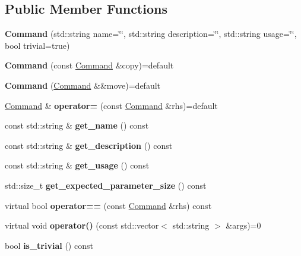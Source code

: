 \subsection*{Public Member Functions}
\begin{DoxyCompactItemize}
\item 
\mbox{\label{class_command_a3cf1e15c821380f4a12e8bd9da620da9}} 
{\bfseries Command} (std\+::string name=\char`\"{}\char`\"{}, std\+::string description=\char`\"{}\char`\"{}, std\+::string usage=\char`\"{}\char`\"{}, bool trivial=true)
\item 
\mbox{\label{class_command_a3d073078862b0cae3b4402f1e4c3b66e}} 
{\bfseries Command} (const \mbox{\hyperlink{class_command}{Command}} \&copy)=default
\item 
\mbox{\label{class_command_a4d99c9b56882eb7f9294ac9ba8e986f2}} 
{\bfseries Command} (\mbox{\hyperlink{class_command}{Command}} \&\&move)=default
\item 
\mbox{\label{class_command_ac482b3ec7da68a7173173e41410b3858}} 
\mbox{\hyperlink{class_command}{Command}} \& {\bfseries operator=} (const \mbox{\hyperlink{class_command}{Command}} \&rhs)=default
\item 
\mbox{\label{class_command_afc03c74d1f90127326015faa8f5f4866}} 
const std\+::string \& {\bfseries get\+\_\+name} () const
\item 
\mbox{\label{class_command_a6352942f26bc7f233584ee707ac46eb1}} 
const std\+::string \& {\bfseries get\+\_\+description} () const
\item 
\mbox{\label{class_command_a0a07c4f1b9b78074268653129bbd6cbb}} 
const std\+::string \& {\bfseries get\+\_\+usage} () const
\item 
\mbox{\label{class_command_ae1e1b915dfc4bbb2633c1b5e331f83e1}} 
std\+::size\+\_\+t {\bfseries get\+\_\+expected\+\_\+parameter\+\_\+size} () const
\item 
\mbox{\label{class_command_a264fd55e96d28e7687a42108539bd9cf}} 
virtual bool {\bfseries operator==} (const \mbox{\hyperlink{class_command}{Command}} \&rhs) const
\item 
\mbox{\label{class_command_a325860d97ad7b70553e3097321ee9952}} 
virtual void {\bfseries operator()} (const std\+::vector$<$ std\+::string $>$ \&args)=0
\item 
\mbox{\label{class_command_a2b9c29afe3b2fd50ef1c8664eec56aec}} 
bool {\bfseries is\+\_\+trivial} () const
\end{DoxyCompactItemize}
